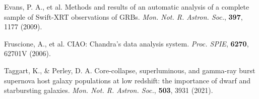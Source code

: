 \documentclass{nature_plusfigure}
\newcommand{\mn}{{Mon. Not. R. Astron. Soc.}}
\newcommand{\mnras}{\mn}
\newcommand{\apj}{{Astrophys. J.}}
\newcommand{\aap}{{Astron. Astrophys.}}
\newcommand{\procspie}{Proc. SPIE}
\begin{document}
\begin{methods}
\begin{thebibliography}{10}
 Evans, P. A., et al. Methods and results of an automatic analysis of a complete sample of Swift-XRT observations of GRBs. \emph{\mnras}, \textbf{397}, 1177 (2009). 

 Fruscione, A., et al. CIAO: Chandra's data analysis system. \emph{\procspie}, \textbf{6270}, 62701V (2006). 


 Taggart, K., \& Perley, D. A. Core-collapse, superluminous, and gamma-ray burst supernova host galaxy populations at low redshift: the importance of dwarf and starbursting galaxies. \emph{\mnras}, \textbf{503}, 3931 (2021). 


%
%
%

\end{thebibliography}

\end{methods}

\clearpage
\end{document}
